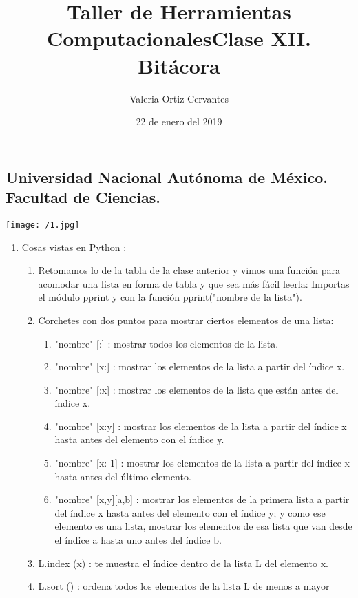 \documentclass{article} %
\title{\Huge Taller de Herramientas Computacionales}
\author{\huge Valeria Ortiz Cervantes}
\date{\LARGE 22 de enero del 2019}
\begin{document}
\maketitle
\begin{center}
	\subsection*{\LARGE Universidad Nacional Autónoma de México.\\Facultad de Ciencias.\\}
	\texttt{[image: /1.jpg]}
\end{center}
\newpage
\title{\LARGE Clase XII. Bitácora\\}
\begin{enumerate}
	\item Cosas vistas en Python :
	\begin{enumerate}
		\item Retomamos lo de la tabla de la clase anterior y vimos una función para acomodar una lista en forma de tabla y que sea más fácil leerla:  Importas el módulo pprint y con la función pprint("nombre de la lista").
		\item Corchetes con dos puntos para mostrar ciertos elementos de una lista:
		\begin{enumerate}
			\item "nombre" [:] : mostrar todos los elementos de la lista.
			\item "nombre" [x:] : mostrar los elementos de la lista a partir del índice x.
			\item "nombre" [:x] : mostrar los elementos de la lista que están antes del índice x.
			\item "nombre" [x:y] : mostrar los elementos de la lista a partir del índice x hasta antes del elemento con el índice y.
			\item "nombre" [x:-1] : mostrar los elementos de la lista a partir del índice x hasta antes del último elemento.
			\item "nombre" [x,y][a,b] : mostrar los elementos de la primera lista a partir del índice x hasta antes del elemento con el índice y; y como ese elemento es una lista, mostrar los elementos de esa lista que van desde el índice a hasta uno antes del índice b.
		\end{enumerate}
		\item L.index (x) : te muestra el índice dentro de la lista L del elemento x.
		\item L.sort () : ordena todos los elementos de la lista L de menos a mayor

\end{enumerate}
\end{enumerate}
\end{document}
